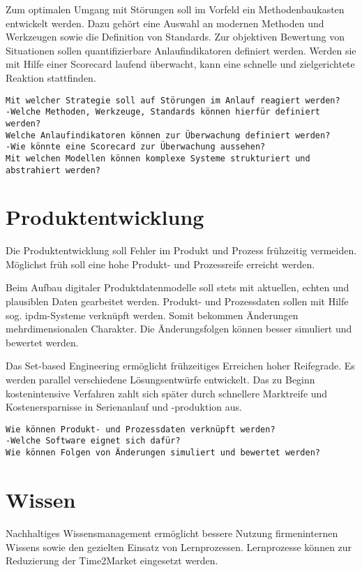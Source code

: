 Zum optimalen Umgang mit Störungen soll im Vorfeld ein Methodenbaukasten entwickelt werden. Dazu gehört eine Auswahl an modernen Methoden und Werkzeugen sowie die Definition von Standards. Zur objektiven Bewertung von Situationen sollen quantifizierbare Anlaufindikatoren definiert werden. Werden sie mit Hilfe einer Scorecard laufend überwacht, kann eine schnelle und zielgerichtete Reaktion stattfinden. 

\begin{verbatim}
Mit welcher Strategie soll auf Störungen im Anlauf reagiert werden? 
-Welche Methoden, Werkzeuge, Standards können hierfür definiert werden? 
Welche Anlaufindikatoren können zur Überwachung definiert werden? 
-Wie könnte eine Scorecard zur Überwachung aussehen? 
Mit welchen Modellen können komplexe Systeme strukturiert und
abstrahiert werden? 
\end{verbatim}


\section{Produktentwicklung}

Die Produktentwicklung soll Fehler im Produkt und Prozess frühzeitig vermeiden. Möglichst früh soll eine hohe Produkt- und Prozessreife erreicht werden. 

Beim Aufbau digitaler Produktdatenmodelle soll stets mit aktuellen, echten und plausiblen Daten gearbeitet werden. Produkt- und Prozessdaten sollen mit Hilfe sog. \gls{ipdm}-Systeme verknüpft werden. Somit bekommen Änderungen mehrdimensionalen Charakter. Die Änderungsfolgen können besser simuliert und bewertet werden. 

Das Set-based Engineering ermöglicht frühzeitiges Erreichen hoher Reifegrade. Es werden parallel verschiedene Lösungsentwürfe entwickelt. Das zu Beginn kostenintensive Verfahren zahlt sich später durch schnellere Marktreife und Kostenersparnisse in Serienanlauf und -produktion aus. 

\begin{verbatim}
Wie können Produkt- und Prozessdaten verknüpft werden? 
-Welche Software eignet sich dafür?
Wie können Folgen von Änderungen simuliert und bewertet werden?
\end{verbatim}


\section{Wissen}

Nachhaltiges Wissensmanagement ermöglicht bessere Nutzung firmeninternen Wissens sowie den gezielten Einsatz von Lernprozessen. Lernprozesse können zur Reduzierung der Time2Market eingesetzt werden. 

